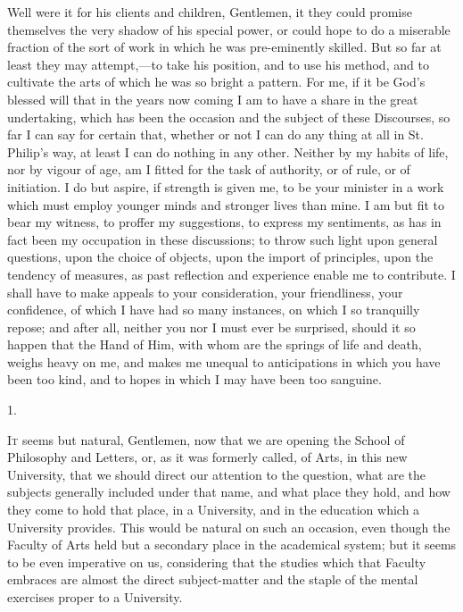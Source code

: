 Well were it for his clients and children, Gentlemen, it they could
promise themselves the very shadow of his special power, or could hope
to do a miserable fraction of the sort of work in which he was
pre-eminently skilled. But so far at least they may attempt,—to take
his position, and to use his method, and to cultivate the arts of
which he was so bright a pattern. For me, if it be God's blessed will
that in the years now coming I am to have a share in the great
undertaking, which has been the occasion and the subject of these
Discourses, so far I can say for certain that, whether or not I can do
any thing at all in St. Philip's way, at least I can do nothing in any
other. Neither by my habits of life, nor by vigour of age, am I fitted
for the task of authority, or of rule, or of initiation. I do but
aspire, if strength is given me, to be your minister in a work which
must employ younger minds and stronger lives than mine. I am but fit
to bear my witness, to proffer my suggestions, to express my
sentiments, as has in fact been my occupation in these discussions; to
throw such light upon general questions, upon the choice of objects,
upon the import of principles, upon the tendency of measures, as past
reflection and experience enable me to contribute. I shall have to
make appeals to your consideration, your friendliness, your
confidence, of which I have had so many instances, on which I so
tranquilly repose; and after all, neither you nor I must ever be
surprised, should it so happen that the Hand of Him, with whom are the
springs of life and death, weighs heavy on me, and makes me unequal to
anticipations in which you have been too kind, and to hopes in which I
may have been too sanguine.



1.

I\textsc{t} seems but natural, Gentlemen, now that we are opening the
School of Philosophy and Letters, or, as it was formerly called, of
Arts, in this new University, that we should direct our attention to
the question, what are the subjects generally included under that
name, and what place they hold, and how they come to hold that place,
in a University, and in the education which a University provides.
This would be natural on such an occasion, even though the Faculty of
Arts held but a secondary place in the academical system; but it seems
to be even imperative on us, considering that the studies which that
Faculty embraces are almost the direct subject-matter and the staple
of the mental exercises proper to a University.

